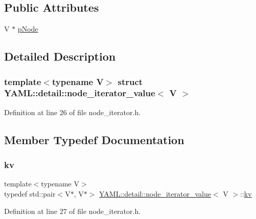 \subsection*{Public Attributes}
\begin{DoxyCompactItemize}
\item 
V $\ast$ \mbox{\hyperlink{struct_y_a_m_l_1_1detail_1_1node__iterator__value_a298d03aed3b8da100a1025d6aed34b1b}{p\+Node}}
\end{DoxyCompactItemize}


\subsection{Detailed Description}
\subsubsection*{template$<$typename V$>$\newline
struct Y\+A\+M\+L\+::detail\+::node\+\_\+iterator\+\_\+value$<$ V $>$}



Definition at line 26 of file node\+\_\+iterator.\+h.



\subsection{Member Typedef Documentation}
\mbox{\label{struct_y_a_m_l_1_1detail_1_1node__iterator__value_a5744c67ddd6e716902be8f268c37a2b1}} 
\subsubsection{\texorpdfstring{kv}{kv}}
{\footnotesize\ttfamily template$<$typename V$>$ \\
typedef std\+::pair$<$V$\ast$, V$\ast$$>$ \mbox{\hyperlink{struct_y_a_m_l_1_1detail_1_1node__iterator__value}{Y\+A\+M\+L\+::detail\+::node\+\_\+iterator\+\_\+value}}$<$ V $>$\+::\mbox{\hyperlink{struct_y_a_m_l_1_1detail_1_1node__iterator__value_a5744c67ddd6e716902be8f268c37a2b1}{kv}}}



Definition at line 27 of file node\+\_\+iterator.\+h.



